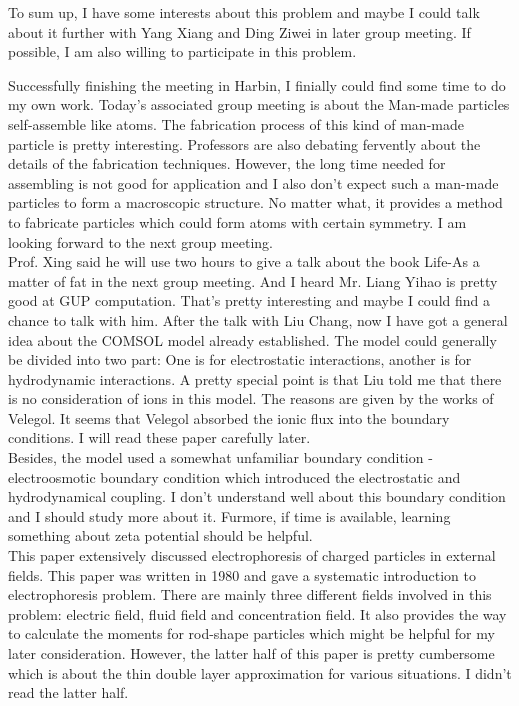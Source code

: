 \documentclass[fontsize=11pt, %
                             paper=a4, %
                             twoside, %
                             captions=tableheading,
                             index=totoc,
                             hyperref]{labbook}
\begin{document}
\begin{addmargin}[4cm]{0cm}
To sum up, I have some interests about this problem and maybe I could talk about it further with Yang Xiang and Ding Ziwei in later group meeting. If possible, I am also willing to participate in this problem.

Successfully finishing the meeting in Harbin, I finially could find some time to do my own work. Today's associated group meeting is about the Man-made particles self-assemble like atoms. The fabrication process of this kind of man-made particle is pretty interesting. Professors are also debating fervently about the details of the fabrication techniques. However, the long time needed for assembling is not good for application and I also don't expect such a man-made particles to form a macroscopic structure. No matter what, it provides a method to fabricate particles which could form atoms with certain symmetry. I am looking forward to the next group meeting. \\
Prof. Xing said he will use two hours to give a talk about the book Life-As a matter of fat in the next group meeting. And I heard Mr. Liang Yihao is pretty good at GUP computation. That's pretty interesting and maybe I could find a chance to talk with him. 
After the talk with Liu Chang, now I have got a general idea about the COMSOL model already established. The model could generally be divided into two part: One is for electrostatic interactions, another is for hydrodynamic interactions. A pretty special point is that Liu told me that there is no consideration of ions in this model. The reasons are given by the works of Velegol\cite{KlineIwataLammertEtAl2006,ChiangVelegol2014}. It seems that Velegol absorbed the ionic flux into the boundary conditions. I will read these paper carefully later.\\
Besides, the model used a somewhat unfamiliar boundary condition - electroosmotic boundary condition which introduced the electrostatic and hydrodynamical coupling. I don't understand well about this boundary condition and I should study more about it. Furmore, if time is available, learning something about zeta potential should be helpful.\\
This paper extensively discussed electrophoresis of charged particles in external fields. This paper was written in 1980 and gave a systematic introduction to electrophoresis problem. There are mainly three different fields involved in this problem: electric field, fluid field and concentration field. It also provides the way to calculate the moments for rod-shape particles \cite{Fixman1980a} which might be helpful for my later consideration. However, the latter half of this paper is pretty cumbersome which is about the thin double layer approximation for various situations. I didn't read the latter half.

\end{addmargin}
\end{document}
